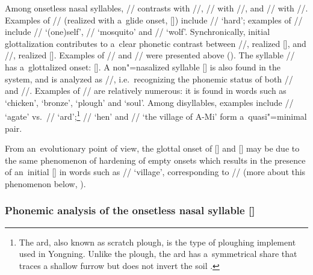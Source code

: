 			Among onsetless nasal syllables, // contrasts with //, // with //, and
			// with //. Examples of // (realized with a~glide onset, []) include
			// ‘hard’; examples of // include // ‘(one)self’, //
			‘mosquito’ and // ‘wolf’. Synchronically, initial glottalization contributes to a~clear
			phonetic contrast between //, realized [], and //, realized
			[]. Examples of // and // were presented above
			(). The syllable // has a~glottalized onset: []. A
			non"=nasalized syllable [] is also found in the system, and is analyzed as //,
			i.e.\ recognizing the phonemic status of both // and //. Examples of // are
			relatively numerous: it is found in words such as ‘chicken’, ‘bronze’, ‘plough’ and ‘soul’. Among
			disyllables, examples include // ‘agate’ vs.\ // ‘ard’;\footnote{The ard, also known as scratch plough, is the type of ploughing implement used in Yongning. Unlike the plough, the ard has a~symmetrical share that traces a shallow furrow but does not invert the soil \citep{haudricourtetal1955}.} // ‘hen’
			and // ‘the village of A-Mi’ form a~quasi"=minimal pair.
			
			From an~evolutionary point of view, the glottal onset of [] and [] may be due to the
			same phenomenon of hardening of empty onsets which results in the presence of an~initial []
			in words such as // ‘village’, corresponding to  // (more about this
			phenomenon below,
			). 
			
			
			\subsubsection{Phonemic analysis of the onsetless nasal syllable  []}
			\label{sec:phonemicanalysisoftheonsetlessnasalsyllable}
			
